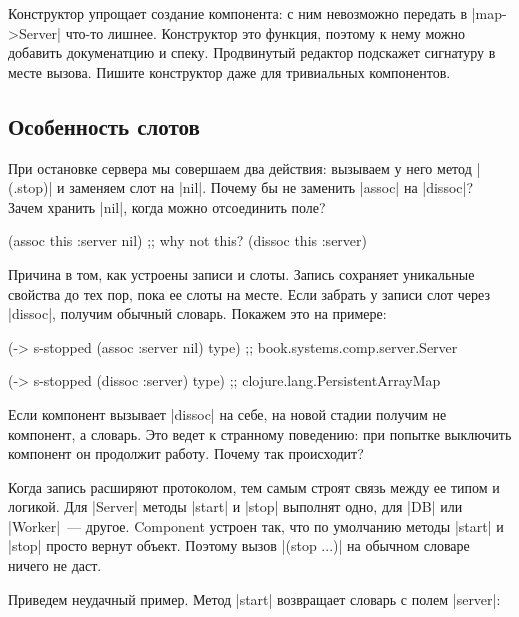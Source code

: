 Конструктор упрощает создание компонента: с ним невозможно передать в
\spverb|map->Server| что-то лишнее. Конструктор это функция, поэтому к нему
можно добавить докуменатцию и спеку. Продвинутый редактор подскажет сигнатуру в
месте вызова. Пишите конструктор даже для тривиальных компонентов.

\subsection{Особенность слотов}

При остановке сервера мы совершаем два действия: вызываем у него метод
\spverb|(.stop)| и заменяем слот на \spverb|nil|. Почему бы не заменить
\spverb|assoc| на \spverb|dissoc|? Зачем хранить \spverb|nil|, когда можно
отсоединить поле?

\begin{english}
  \begin{clojure}
(assoc this :server nil)
;; why not this?
(dissoc this :server)
  \end{clojure}
\end{english}

Причина в том, как устроены записи и слоты. Запись сохраняет уникальные свойства
до тех пор, пока ее слоты на месте. Если забрать у записи слот через
\spverb|dissoc|, получим обычный словарь. Покажем это на примере:

\begin{english}
  \begin{clojure}
(-> s-stopped (assoc :server nil) type)
;; book.systems.comp.server.Server

(-> s-stopped (dissoc :server) type)
;; clojure.lang.PersistentArrayMap
  \end{clojure}
\end{english}

Если компонент вызывает \spverb|dissoc| на себе, на новой стадии получим не
компонент, а словарь. Это ведет к странному поведению: при попытке выключить
компонент он продолжит работу. Почему так происходит?

Когда запись расширяют протоколом, тем самым строят связь между ее типом и
логикой. Для \spverb|Server| методы \spverb|start| и \spverb|stop| выполнят
одно, для \spverb|DB| или \spverb|Worker|~--- другое. Component устроен так, что
по умолчанию методы \spverb|start| и \spverb|stop| просто вернут объект. Поэтому
вызов \spverb|(stop {...})| на обычном словаре ничего не даст.

Приведем неудачный пример. Метод \spverb|start| возвращает словарь с полем
\spverb|server|:

